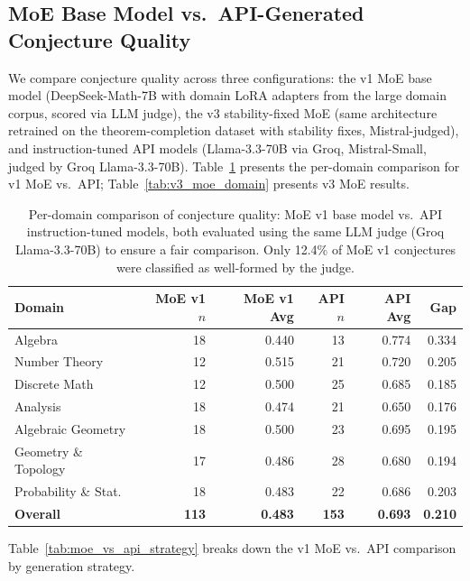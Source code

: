 \documentclass[11pt,a4paper]{article}
\begin{document}
\subsection{MoE Base Model vs.\ API-Generated Conjecture Quality}
\label{sec:moe_vs_api}

We compare conjecture quality across three configurations: the v1 MoE base model (DeepSeek-Math-7B with domain LoRA adapters from the large domain corpus, scored via LLM judge), the v3 stability-fixed MoE (same architecture retrained on the theorem-completion dataset with stability fixes, Mistral-judged), and instruction-tuned API models (Llama-3.3-70B via Groq, Mistral-Small, judged by Groq Llama-3.3-70B). Table~\ref{tab:moe_vs_api_domain} presents the per-domain comparison for v1 MoE vs.\ API; Table~\ref{tab:v3_moe_domain} presents v3 MoE results.

\begin{table}[t]
\centering
\caption{Per-domain comparison of conjecture quality: MoE v1 base model vs.\ API instruction-tuned models, both evaluated using the same LLM judge (Groq Llama-3.3-70B) to ensure a fair comparison. Only 12.4\% of MoE v1 conjectures were classified as well-formed by the judge.}
\label{tab:moe_vs_api_domain}
\small
\begin{tabular}{@{}lrrrrr@{}}
\toprule
\textbf{Domain} & \textbf{MoE v1 $n$} & \textbf{MoE v1 Avg} & \textbf{API $n$} & \textbf{API Avg} & \textbf{Gap} \\
\midrule
Algebra             & 18 & 0.440 & 13 & 0.774 & 0.334 \\
Number Theory       & 12 & 0.515 & 21 & 0.720 & 0.205 \\
Discrete Math       & 12 & 0.500 & 25 & 0.685 & 0.185 \\
Analysis            & 18 & 0.474 & 21 & 0.650 & 0.176 \\
Algebraic Geometry  & 18 & 0.500 & 23 & 0.695 & 0.195 \\
Geometry \& Topology & 17 & 0.486 & 28 & 0.680 & 0.194 \\
Probability \& Stat. & 18 & 0.483 & 22 & 0.686 & 0.203 \\
\midrule
\textbf{Overall}    & \textbf{113} & \textbf{0.483} & \textbf{153} & \textbf{0.693} & \textbf{0.210} \\
\bottomrule
\end{tabular}
\end{table}

Table~\ref{tab:moe_vs_api_strategy} breaks down the v1 MoE vs.\ API comparison by generation strategy.
\end{document}
